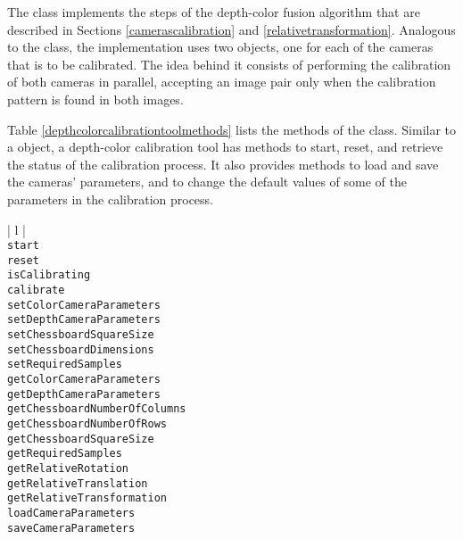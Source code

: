 The \DepthColorCalibrationTool{} class implements the steps of the depth-color fusion algorithm that are 
described in Sections \ref{camerascalibration} and \ref{relativetransformation}. Analogous to the 
\DepthColorCam{} class, the implementation uses two \CalibrationTool{} objects, one for each of the cameras 
that is to be calibrated. The idea behind it consists of performing the calibration of both cameras in parallel, 
accepting an image pair only when the calibration pattern is found in both images.

Table \ref{depthcolorcalibrationtoolmethods} lists the methods of the \DepthColorCalibrationTool{} class. Similar
to a \CalibrationTool{} object, a depth-color calibration tool has methods to start, reset, and retrieve the status 
of the calibration process. It also provides methods to load and save the cameras' parameters, and to change
the default values of some of the parameters in the calibration process. 

\begin{table}[ht]
\caption{Public methods in the \DepthColorCalibrationTool{} class}
\begin{center}
\begin{tabular}{| l |}
	\hline 
	 \\
	\hline \hline
	\texttt{start} \\
	\texttt{reset} \\
	\texttt{isCalibrating} \\
	\texttt{calibrate} \\
	\texttt{setColorCameraParameters} \\
	\texttt{setDepthCameraParameters} \\
	\texttt{setChessboardSquareSize} \\
	\texttt{setChessboardDimensions} \\
	\texttt{setRequiredSamples} \\
	\texttt{getColorCameraParameters} \\
	\texttt{getDepthCameraParameters} \\
	\texttt{getChessboardNumberOfColumns} \\
	\texttt{getChessboardNumberOfRows} \\
	\texttt{getChessboardSquareSize} \\
	\texttt{getRequiredSamples} \\
	\texttt{getRelativeRotation} \\
	\texttt{getRelativeTranslation} \\
	\texttt{getRelativeTransformation} \\
	\texttt{loadCameraParameters} \\
	\texttt{saveCameraParameters} \\ 
	\hline
\end{tabular}
\end{center}
\label{depthcolorcalibrationtoolmethods}
\end{table}

